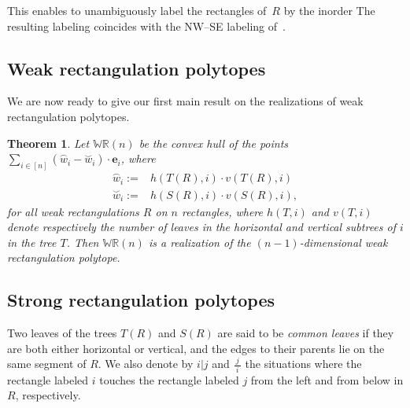 \documentclass{amsart}
\newtheorem{theorem}{Theorem}%
\theoremstyle{definition}
\newcommand{\darkblue}{\color{darkblue}} %
\newcommand{\defn}[1]{\textsl{\darkblue #1}} %
\newcommand{\polytope}[1]{\mathds{#1}} %
\newcommand{\WRP}{\polytope{WR}} %
\newcommand{\loday}[1]{\overset{\frown}{#1}}
\newcommand{\antiloday}[1]{\overset{\smile}{#1}}
\begin{document}
This enables to unambiguously label the rectangles of~$R$ by the inorder 
The resulting labeling coincides with the NW--SE labeling of~\cite{AsinowskiCardinalFelsnerFusy}.

\subsection{Weak rectangulation polytopes}

We are now ready to give our first main result on the realizations of weak rectangulation polytopes.

\begin{theorem}
  Let $\WRP (n)$ be the convex hull of the points
  $\sum_{i\in [n]} (\loday{w}_i - \antiloday{w}_i)\cdot \mathbf{e}_i$,
  where
  \[
  \begin{split}
    \loday{w}_i := & h(T(R), i)\cdot v(T(R),i) \\
    \antiloday{w}_i := & h(S(R), i)\cdot v(S(R),i),
  \end{split}
  \]
  for all weak rectangulations $R$ on $n$ rectangles, where $h(T,i)$ and $v(T,i)$ denote respectively the number of leaves in the horizontal and vertical subtrees of $i$ in the tree $T$.
  Then $\WRP (n)$ is a realization of the $(n-1)$-dimensional weak rectangulation polytope.
\end{theorem}

\subsection{Strong rectangulation polytopes}

Two leaves of the trees $T(R)$ and $S(R)$ are said to be \defn{common leaves} if they are both either horizontal or vertical, and the edges to their parents lie on the same segment of $R$. We also denote by $i|j$ and $\frac{\ j\ }i$ the situations where the rectangle labeled $i$ touches the rectangle labeled $j$ from the left and from below in $R$, respectively.
\end{document}
